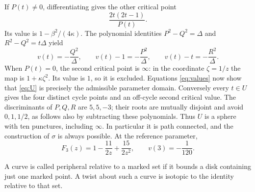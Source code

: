 \documentclass[11pt]{article}
\theoremstyle{remark}
\begin{document}
If $P(t)\ne0$, differentiating gives the other critical point
\[
 \frac{2t(2t-1)}{P(t)}.
\]
Its value is $1-\beta^2/(4\kappa)$. The polynomial identities
$P^2-Q^2=\Delta$ and $R^2-Q^2=t\Delta$ yield
\begin{equation}\label{eq:values}
 v(t)=-\frac{Q^2}{\Delta},\qquad
 v(t)-1=-\frac{P^2}{\Delta},\qquad
 v(t)-t=-\frac{R^2}{\Delta}.
\end{equation}
When $P(t)=0$, the second critical point is $\infty$: in the coordinate $\zeta=1/z$ the map is $1+\kappa\zeta^2$. Its value is $1$, so it is excluded. Equations \eqref{eq:values} now show that \eqref{eq:U} is precisely the admissible parameter domain. Conversely every $t\in U$ gives the four distinct cycle points and an off-cycle second critical value. The discriminants of $P,Q,R$ are $5,5,-3$; their roots are mutually disjoint and avoid $0,1,1/2$, as follows also by subtracting these polynomials. Thus $U$ is a sphere with ten punctures, including $\infty$. In particular it is path connected, and the construction of $\sigma$ is always possible. At the reference parameter,
\begin{equation}\label{eq:model}
 F_3(z)=1-\frac{11}{2z}+\frac{15}{2z^2},\qquad v(3)=-\frac1{120}.
\end{equation}

A curve is called peripheral relative to a marked set if it bounds a disk containing just one marked point. A twist about such a curve is isotopic to the identity relative to that set.
\end{document}
